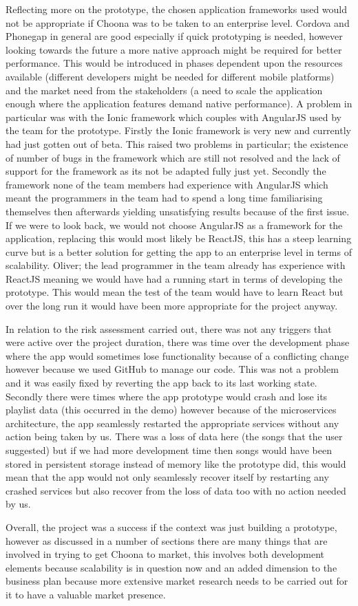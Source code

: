Reflecting more on the prototype, the chosen application frameworks used would not be appropriate if Choona was to be taken to an enterprise level. Cordova and Phonegap in general are good especially if quick prototyping is needed, however looking towards the future a more native approach might be required for better performance. This would be introduced in phases dependent upon the resources available (different developers might be needed for different mobile platforms) and the market need from the stakeholders (a need to scale the application enough where the application features demand native performance). A problem in particular was with the Ionic framework which couples with AngularJS used by the team for the prototype. Firstly the Ionic framework is very new and currently had just gotten out of beta. This raised two problems in particular; the existence of number of bugs in the framework which are still not resolved and the lack of support for the framework as its not be adapted fully just yet. Secondly the framework none of the team members had experience with AngularJS which meant the programmers in the team had to spend a long time familiarising themselves then afterwards yielding unsatisfying results because of the first issue. If we were to look back, we would not choose AngularJS as a framework for the application, replacing this would most likely be ReactJS, this has a steep learning curve but is a better solution for getting the app to an enterprise level in terms of scalability. Oliver; the lead programmer in the team already has experience with ReactJS meaning we would have had a running start in terms of developing the prototype. This would mean the test of the team would have to learn React but over the long run it would have been more appropriate for the project anyway.

In relation to the risk assessment carried out, there was not any triggers that were active over the project duration, there was time over the development phase where the app would sometimes lose functionality because of a conflicting change however because we used GitHub to manage our code. This was not a problem and it was easily fixed by reverting the app back to its last working state. Secondly there were times where the app prototype would crash and lose its playlist data (this occurred in the demo) however because of the microservices architecture, the app seamlessly restarted the appropriate services without any action being taken by us. There was a loss of data here (the songs that the user suggested) but if we had more development time then songs would have been stored in persistent storage instead of memory like the prototype did, this would mean that the app would not only seamlessly recover itself by restarting any crashed services but also recover from the loss of data too with no action needed by us.

Overall, the project was a success if the context was just building a prototype, however as discussed in a number of sections there are many things that are involved in trying to get Choona to market, this involves both development elements because scalability is in question now and an added dimension to the business plan because more extensive market research needs to be carried out for it to have a valuable market presence.
